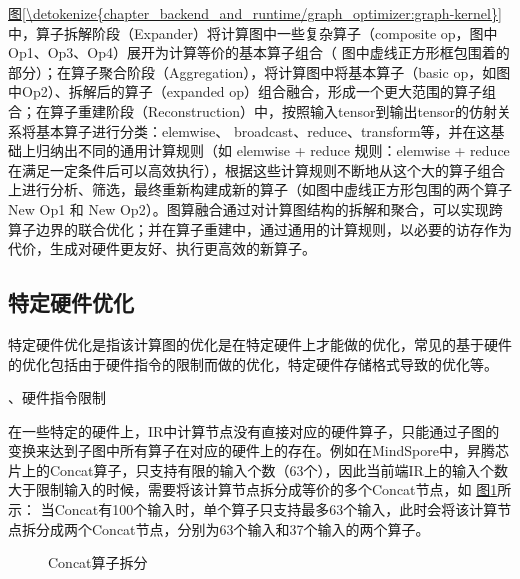 \documentclass[letterpaper,10pt,english]{sphinxmanual}
\let\sphinxpxdimen\pdfpxdimen\else\newdimen\sphinxpxdimen
\begin{document}
\sphinxAtStartPar
\hyperref[\detokenize{chapter_backend_and_runtime/graph_optimizer:graph-kernel}]{图\ref{\detokenize{chapter_backend_and_runtime/graph_optimizer:graph-kernel}}}中，算子拆解阶段（Expander）将计算图中一些复杂算子（composite
op，图中Op1、Op3、Op4）展开为计算等价的基本算子组合（
图中虚线正方形框包围着的部分）；在算子聚合阶段（Aggregation），将计算图中将基本算子（basic
op，如图中Op2）、拆解后的算子（expanded
op）组合融合，形成一个更大范围的算子组合；在算子重建阶段（Reconstruction）中，按照输入tensor到输出tensor的仿射关系将基本算子进行分类：elemwise、
broadcast、reduce、transform等，并在这基础上归纳出不同的通用计算规则（如
elemwise + reduce 规则：elemwise +
reduce在满足一定条件后可以高效执行），根据这些计算规则不断地从这个大的算子组合上进行分析、筛选，最终重新构建成新的算子（如图中虚线正方形包围的两个算子
New Op1 和 New
Op2）。图算融合通过对计算图结构的拆解和聚合，可以实现跨算子边界的联合优化；并在算子重建中，通过通用的计算规则，以必要的访存作为代价，生成对硬件更友好、执行更高效的新算子。


\subsection{特定硬件优化}
\label{\detokenize{chapter_backend_and_runtime/graph_optimizer:id3}}
\sphinxAtStartPar
特定硬件优化是指该计算图的优化是在特定硬件上才能做的优化，常见的基于硬件的优化包括由于硬件指令的限制而做的优化，特定硬件存储格式导致的优化等。

、硬件指令限制

\sphinxAtStartPar
在一些特定的硬件上，IR中计算节点没有直接对应的硬件算子，只能通过子图的变换来达到子图中所有算子在对应的硬件上的存在。例如在MindSpore中，昇腾芯片上的Concat算子，只支持有限的输入个数（63个），因此当前端IR上的输入个数大于限制输入的时候，需要将该计算节点拆分成等价的多个Concat节点，如
\hyperref[\detokenize{chapter_backend_and_runtime/graph_optimizer:concat}]{图\ref{\detokenize{chapter_backend_and_runtime/graph_optimizer:concat}}}所示：
当Concat有100个输入时，单个算子只支持最多63个输入，此时会将该计算节点拆分成两个Concat节点，分别为63个输入和37个输入的两个算子。

\begin{figure}[H]
\centering
\capstart

\noindent\sphinxincludegraphics[width=800\sphinxpxdimen]{{concat}.png}
\caption{Concat算子拆分}\label{\detokenize{chapter_backend_and_runtime/graph_optimizer:id6}}\label{\detokenize{chapter_backend_and_runtime/graph_optimizer:concat}}\end{figure}
\end{document}
